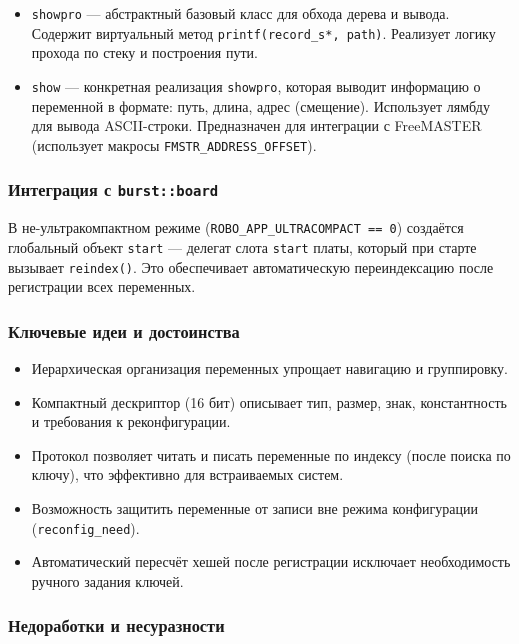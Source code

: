 \documentclass[a4paper,12pt]{article}
\begin{document}
\begin{itemize}
    \item \texttt{showpro} — абстрактный базовый класс для обхода дерева и вывода. Содержит виртуальный метод \texttt{printf(record\_s*, path)}. Реализует логику прохода по стеку и построения пути.
    \item \texttt{show} — конкретная реализация \texttt{showpro}, которая выводит информацию о переменной в формате: путь, длина, адрес (смещение). Использует лямбду для вывода ASCII-строки. Предназначен для интеграции с FreeMASTER (использует макросы \texttt{FMSTR\_ADDRESS\_OFFSET}).
\end{itemize}

\subsubsection{Интеграция с \texttt{burst::board}}

В не-ультракомпактном режиме (\texttt{ROBO\_APP\_ULTRACOMPACT == 0}) создаётся глобальный объект \texttt{start} — делегат слота \texttt{start} платы, который при старте вызывает \texttt{reindex()}. Это обеспечивает автоматическую переиндексацию после регистрации всех переменных.

\subsubsection{Ключевые идеи и достоинства}

\begin{itemize}
    \item Иерархическая организация переменных упрощает навигацию и группировку.
    \item Компактный дескриптор (16 бит) описывает тип, размер, знак, константность и требования к реконфигурации.
    \item Протокол позволяет читать и писать переменные по индексу (после поиска по ключу), что эффективно для встраиваемых систем.
    \item Возможность защитить переменные от записи вне режима конфигурации (\texttt{reconfig\_need}).
    \item Автоматический пересчёт хешей после регистрации исключает необходимость ручного задания ключей.
\end{itemize}

\subsubsection{Недоработки и несуразности}
\end{document}
